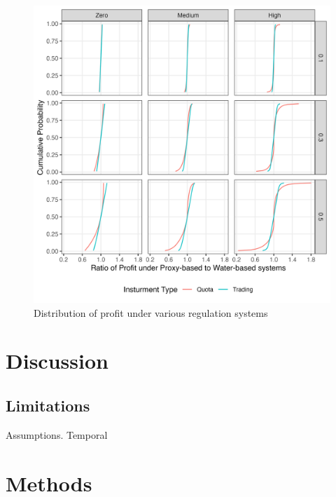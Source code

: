 \documentclass[
]{article}
\begin{document}
\begin{figure}[H]

{\centering \includegraphics{figures/g_profit_ratio} 

}

\caption{Distribution of profit under various regulation systems}\label{fig:distributional-equity}
\end{figure}

\hypertarget{discussion}{%
\section{Discussion}\label{discussion}}

\hypertarget{limitations}{%
\subsection{Limitations}\label{limitations}}

Assumptions.
Temporal

\hypertarget{methods}{%
\section{Methods}\label{methods}}

\hypertarget{section}{%
\subsection{}\label{section}}
\end{document}
